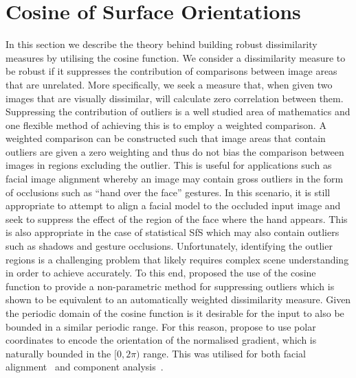 \section{Cosine of Surface Orientations}\label{sec:singl_img_cosine_orientations}
In this section we describe the theory behind building robust dissimilarity
measures by utilising the cosine function. We consider a
dissimilarity measure to be robust if it suppresses the contribution of
comparisons between image areas that are unrelated. More specifically, we seek a
measure that, when given two images that are visually dissimilar, will calculate
zero correlation between them. Suppressing the contribution of outliers is
a well studied area of mathematics and one flexible method of achieving this
is to employ a weighted comparison. A weighted comparison can be constructed
such that image areas that contain outliers are given a zero weighting and thus
do not bias the comparison between images in regions excluding the outlier.
This is useful for applications such as facial image alignment whereby an image
may contain gross outliers in the form of occlusions such as ``hand over the
face'' gestures. In this scenario, it is still appropriate to attempt to
align a facial model to the occluded input image and seek to suppress
the effect of the region of the face where the hand appears. This is also
appropriate in the case of statistical SfS which may also contain outliers
such as shadows and gesture occlusions. Unfortunately, identifying the outlier
regions is a challenging problem that likely requires complex scene
understanding in order to achieve accurately.
To this end, \citet{tzimiropoulos2012subspace} proposed the use of the cosine
function to provide a non-parametric method for suppressing outliers which
is shown to be equivalent to an automatically weighted dissimilarity measure.
Given the periodic domain of the cosine function is it desirable for the
input to also be bounded in a similar periodic range. For this reason,
\citet{tzimiropoulos2012subspace} propose to use polar coordinates to encode
the orientation of the normalised gradient, which is naturally bounded in the
$[0, 2\pi)$ range. This was utilised for both facial
alignment~\cite{tzimiropoulos2011robust,tzimiropoulos2014active,%
antonakos2015feature} and component
analysis~\cite{tzimiropoulos2012subspace,tzimiropoulos2014active}.

